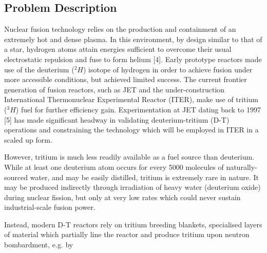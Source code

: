 \subsection{Problem Description}
\label{sec:problemdescription}

Nuclear fusion technology relies on the production and containment of an extremely hot and dense plasma. In this environment, by design similar to that of a star, hydrogen atoms attain energies sufficient to overcome their usual electrostatic repulsion and fuse to form helium [4]. Early prototype reactors made use of the deuterium ($^2H$) isotope of hydrogen in order to achieve fusion under more accessible conditions, but achieved limited success. The current frontier generation of fusion reactors, such as JET and the under-construction International Thermonuclear Experimental Reactor (ITER), make use of tritium ($^3H$) fuel for further efficiency gain. Experimentation at JET dating back to 1997 [5] has made significant headway in validating deuterium-tritium (D-T) operations and constraining the technology which will be employed in ITER in a scaled up form.

However, tritium is much less readily available as a fuel source than deuterium. While at least one deuterium atom occurs for every 5000 molecules of naturally-sourced water, and may be easily distilled, tritium is extremely rare in nature. It may be produced indirectly through irradiation of heavy water (deuterium oxide) during nuclear fission, but only at very low rates which could never sustain industrial-scale fusion power.

Instead, modern D-T reactors rely on tritium breeding blankets, specialised layers of material which partially line the reactor and produce tritium upon neutron bombardment, e.g. by 

